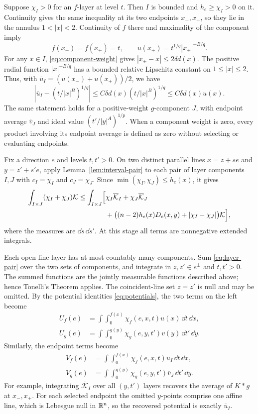 Suppose $\chi_I>0$ for an $f$-layer at level $t$.  Then $I$ is
bounded and $h_e\ge\chi_I>0$ on it.  Continuity gives the same
inequality at its two endpoints $x_-,x_+$, so they lie in the
annulus $1<|x|<2$.  Continuity of $f$ there and maximality of the
component imply
\[
 f(x_-)=f(x_+)=t,\qquad
 u(x_\pm)=t^{1/q}|x_\pm|^{-B/q}.
\]
For any $x\in I$, \eqref{eq:component-weight} gives
$|x_\pm-x|\le2\delta d(x)$.  The positive radial function
$|x|^{-B/q}$ has a bounded relative Lipschitz constant on
$1\le|x|\le2$.  Thus, with
$\overline u_I=(u(x_-)+u(x_+))/2$, we have
\begin{equation}\label{eq:weighted-endpoints}
 \left|\overline u_I-(t/|x|^B)^{1/q}\right|
 \le C\delta d(x)(t/|x|^B)^{1/q}
 \le C\delta d(x)u(x).
\end{equation}
The same statement holds for a positive-weight $g$-component $J$,
with endpoint average $\overline v_J$ and ideal value
$(t'/|y|^A)^{1/p}$.  When a component weight is zero, every product
involving its endpoint average is defined as zero without selecting
or evaluating endpoints.

Fix a direction $e$ and levels $t,t'>0$.  On two distinct parallel
lines $x=z+se$ and $y=z'+s'e$, apply
Lemma~\ref{lem:interval-pair} to each pair of layer components $I,J$
with $c_I=\chi_I$ and $c_J=\chi_J$.  Since
$\min(\chi_I,\chi_J)\le h_e(x)$, it gives
\begin{equation}\label{eq:layer-pair}
\begin{split}
 \int_{I\times J}(\chi_I+\chi_J)\mathcal K
 \le\int_{I\times J}\Bigl[
  &\chi_I\overline{\mathcal K}_I+\chi_J\overline{\mathcal K}_J\\
  &+\bigl((n-2)h_e(x)D_e(x,y)+|\chi_I-\chi_J|\bigr)
       \mathcal K\Bigr],
\end{split}
\end{equation}
where the measures are $\dd s\,\dd s'$.  At this stage all terms
are nonnegative extended integrals.

Each open line layer has at most countably many components.  Sum
\eqref{eq:layer-pair} over the two sets of components, and integrate
in $z,z'\in e^\perp$ and $t,t'>0$.  The summed functions are the
jointly measurable functions described above; hence Tonelli's
Theorem applies.  The coincident-line set $z=z'$ is null and may be
omitted.  By the potential identities \eqref{eq:potentials}, the two
terms on the left become
\begin{align*}
 U_f(e)&=\int\int_0^{f(x)}\chi_f(e,x,t)u(x)\,\dd t\,\dd x,\\
 U_g(e)&=\int\int_0^{g(y)}\chi_g(e,y,t')v(y)\,\dd t'\,\dd y.
\end{align*}
Similarly, the endpoint terms become
\begin{align*}
 V_f(e)&=\int\int_0^{f(x)}\chi_f(e,x,t)\overline u_I\,\dd t\,\dd x,\\
 V_g(e)&=\int\int_0^{g(y)}\chi_g(e,y,t')\overline v_J\,\dd t'\,\dd y.
\end{align*}
For example, integrating $\overline{\mathcal K}_I$ over all
$(y,t')$ layers recovers the average of $K*g$ at $x_-,x_+$.
For each selected endpoint the omitted $y$-points comprise one
affine line, which is Lebesgue null in $\mathbb R^n$, so the recovered
potential is exactly $\overline u_I$.


